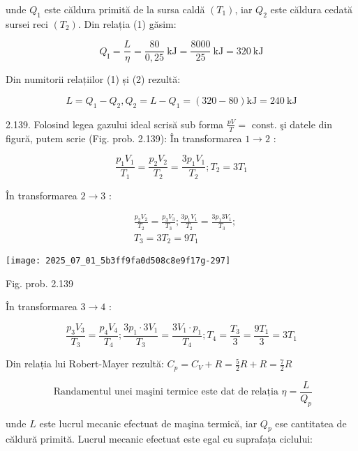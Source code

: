 unde $Q_{1}$ este căldura primită de la sursa caldă $\left(T_{1}\right)$, iar $Q_{2}$ este căldura cedată sursei reci $\left(T_{2}\right)$. Din relația (1) găsim:

$$
Q_{\mathrm{I}}=\frac{L}{\eta}=\frac{80}{0,25} \mathrm{~kJ}=\frac{8000}{25} \mathrm{~kJ}=320 \mathrm{~kJ}
$$

Din numitorii relațiilor (1) și (2) rezultă:

$$
L=Q_{1}-Q_{2}, Q_{2}=L-Q_{1}=(320-80) \mathrm{kJ}=240 \mathrm{~kJ}
$$

2.139. Folosind legea gazului ideal scrisă sub forma $\frac{p V}{T}=$ const. şi datele din figură, putem scrie (Fig. prob. 2.139): În transformarea $1 \rightarrow 2$ :


\begin{equation*}
\frac{p_{1} V_{1}}{T_{1}}=\frac{p_{2} V_{2}}{T_{2}}=\frac{3 p_{1} V_{1}}{T_{2}} ; T_{2}=3 T_{1} \tag{1}
\end{equation*}


În transformarea $2 \rightarrow 3$ :


\begin{align*}
& \frac{p_{2} V_{2}}{T_{2}}=\frac{p_{3} V_{3}}{T_{3}} ; \frac{3 p_{1} V_{1}}{T_{2}}=\frac{3 p_{1} 3 V_{1}}{T_{3}} ;  \tag{2}\\
& T_{3}=3 T_{2}=9 T_{1}
\end{align*}


\begin{center}
\texttt{[image: 2025\_07\_01\_5b3ff9fa0d508c8e9f17g-297]}
\end{center}

Fig. prob. 2.139

În transformarea $3 \rightarrow 4$ :


\begin{equation*}
\frac{p_{3} V_{3}}{T_{3}}=\frac{p_{4} V_{4}}{T_{4}} ; \frac{3 p_{1} \cdot 3 V_{1}}{T_{3}}=\frac{3 V_{1} \cdot p_{1}}{T_{4}} ; T_{4}=\frac{T_{3}}{3}=\frac{9 T_{1}}{3}=3 T_{1} \tag{3}
\end{equation*}


Din relația lui Robert-Mayer rezultă: $C_{p}=C_{V}+R=\frac{5}{2} R+R=\frac{7}{2} R$


\begin{equation*}
\text { Randamentul unei maşini termice este dat de relația } \eta=\frac{L}{Q_{p}} \tag{4}
\end{equation*}


unde $L$ este lucrul mecanic efectuat de maşina termică, iar $Q_{p}$ ese cantitatea de căldură primită. Lucrul mecanic efectuat este egal cu suprafața ciclului:


